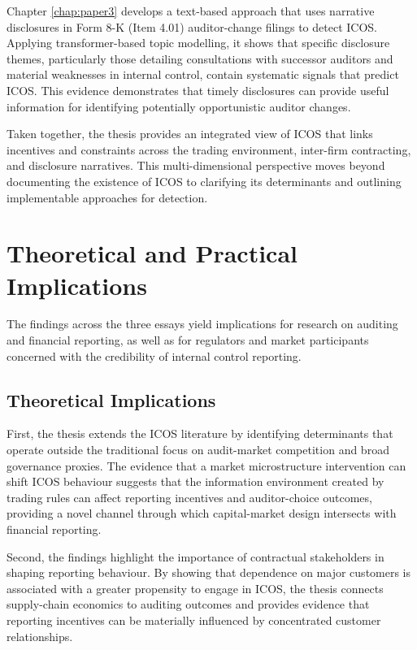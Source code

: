 \documentclass[12pt, a4paper]{report}
\begin{document}
Chapter \ref{chap:paper3} develops a text-based approach that uses narrative disclosures in Form 8-K (Item 4.01) auditor-change filings to detect ICOS. Applying transformer-based topic modelling, it shows that specific disclosure themes, particularly those detailing consultations with successor auditors and material weaknesses in internal control, contain systematic signals that predict ICOS. This evidence demonstrates that timely disclosures can provide useful information for identifying potentially opportunistic auditor changes.

Taken together, the thesis provides an integrated view of ICOS that links incentives and constraints across the trading environment, inter-firm contracting, and disclosure narratives. This multi-dimensional perspective moves beyond documenting the existence of ICOS to clarifying its determinants and outlining implementable approaches for detection.

\section{Theoretical and Practical Implications}

The findings across the three essays yield implications for research on auditing and financial reporting, as well as for regulators and market participants concerned with the credibility of internal control reporting.

\subsection{Theoretical Implications}

First, the thesis extends the ICOS literature by identifying determinants that operate outside the traditional focus on audit-market competition and broad governance proxies. The evidence that a market microstructure intervention can shift ICOS behaviour suggests that the information environment created by trading rules can affect reporting incentives and auditor-choice outcomes, providing a novel channel through which capital-market design intersects with financial reporting.

Second, the findings highlight the importance of contractual stakeholders in shaping reporting behaviour. By showing that dependence on major customers is associated with a greater propensity to engage in ICOS, the thesis connects supply-chain economics to auditing outcomes and provides evidence that reporting incentives can be materially influenced by concentrated customer relationships.
\end{document}
